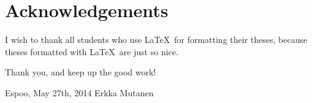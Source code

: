 \documentclass[12pt,a4paper,oneside,pdftex]{report}
\newcommand{\DATE}{May 27th, 2014}
\newcommand{\AUTHOR}{Erkka Mutanen}
\begin{document}




\chapter*{Acknowledgements}

I wish to thank all students who use \LaTeX\ for formatting their theses,
because theses formatted with \LaTeX\ are just so nice.

Thank you, and keep up the good work!
\vskip 10mm

\noindent Espoo, \DATE
\vskip 5mm
\noindent\AUTHOR

\cleardoublepage
\tableofcontents

\cleardoublepage
% 
\end{document}
